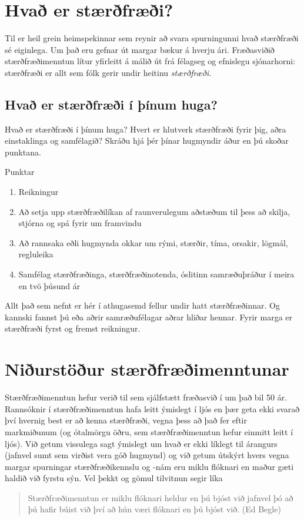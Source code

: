 \documentclass[
  icelandic,
]{book}
\providecommand{\tightlist}{%
  \setlength{\itemsep}{0pt}\setlength{\parskip}{0pt}}
\begin{document}
\section{Hvað er stærðfræði?}\label{hvad-stae}

Til er heil grein heimspekinnar sem reynir að svara spurningunni hvað stærðfræði sé eiginlega. Um það eru gefnar út margar bækur á hverju ári. Fræðasviðið stærðfræðimenntun lítur yfirleitt á málið út frá félagseg og efnislegu sjónarhorni: stærðfræði er allt sem fólk gerir undir heitinu \emph{stærðfræði}.

\subsection{Hvað er stærðfræði í þínum huga?}\label{stae-thinum-huga}

Hvað er stærðfræði í þínum huga? Hvert er hlutverk stærðfræði fyrir þig, aðra einstaklinga og samfélagið? Skráðu hjá þér þínar hugmyndir áður en þú skoðar punktana.

Punktar

\begin{enumerate}
\def\labelenumi{\alph{enumi}.}
\tightlist
\item
  Reikningur
\item
  Að setja upp stærðfræðilíkan af raunverulegum aðstæðum til þess að skilja, stjórna og spá fyrir um framvindu
\item
  Að rannsaka eðli hugmynda okkar um rými, stærðir, tíma, orsakir, lögmál, regluleika
\item
  Samfélag stærðfræðinga, stærðfræðinotenda, óslitinn samræðuþráður í meira en tvö þúsund ár
\end{enumerate}

Allt það sem nefnt er hér í athugasemd fellur undir hatt stærðfræðinnar. Og kannski fannst þú eða aðrir samræðufélagar aðrar hliðar hennar. Fyrir marga er stærðfræði fyrst og fremst reikningur.

\section{Niðurstöður stærðfræðimenntunar}\label{staemennt-statements}

Stærðfræðimenntun hefur verið til sem sjálfstætt fræðasvið í um það bil 50 ár. Rannsóknir í stærðfræðimenntun hafa leitt ýmislegt í ljós en þær geta ekki svarað því hvernig best er að kenna stærðfræði, vegna þess að það fer eftir markmiðunum (og ótalmörgu öðru, sem stærðfræðimenntun hefur einmitt leitt í ljós). Við getum vissulega sagt ýmislegt um hvað er ekki líklegt til árangurs (jafnvel sumt sem virðist vera góð hugmynd) og við getum útskýrt hvers vegna margar spurningar stærðfræðikennslu og -nám eru miklu flóknari en maður gæti haldið við fyrstu sýn. Vel þekkt og gömul tilvitnun segir líka

\begin{quote}
Stærðfræðimenntun er miklu flóknari heldur en þú bjóst við jafnvel þó að þú hafir búist við því að hún væri flóknari en þú bjóst við. (Ed Begle)
\end{quote}

\printbibliography
\end{document}
